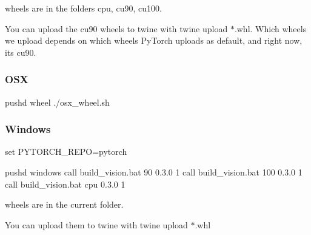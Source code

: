 

wheels are in the folders {\ttfamily cpu}, {\ttfamily cu90}, {\ttfamily cu100}.

You can upload the {\ttfamily cu90} wheels to twine with {\ttfamily twine upload $\ast$.whl}. Which wheels we upload depends on which wheels Py\+Torch uploads as default, and right now, it\textquotesingle{}s {\ttfamily cu90}.

\subsubsection*{O\+SX}


\begin{DoxyCode}
pushd wheel
./osx\_wheel.sh
\end{DoxyCode}


\subsubsection*{Windows}


\begin{DoxyCode}
set PYTORCH\_REPO=pytorch

pushd windows
call build\_vision.bat 90 0.3.0 1
call build\_vision.bat 100 0.3.0 1
call build\_vision.bat cpu 0.3.0 1
\end{DoxyCode}


wheels are in the current folder.

You can upload them to twine with {\ttfamily twine upload $\ast$.whl} 